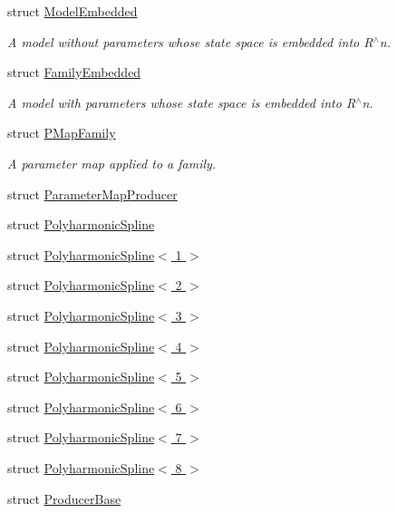 \begin{DoxyCompactItemize}
struct \hyperlink{struct_d_r_d_s_p_1_1_model_embedded}{Model\-Embedded}
\begin{DoxyCompactList}\small\item\em A model without parameters whose state space is embedded into R$^\wedge$n. \end{DoxyCompactList}\item 
struct \hyperlink{struct_d_r_d_s_p_1_1_family_embedded}{Family\-Embedded}
\begin{DoxyCompactList}\small\item\em A model with parameters whose state space is embedded into R$^\wedge$n. \end{DoxyCompactList}\item 
struct \hyperlink{struct_d_r_d_s_p_1_1_p_map_family}{P\-Map\-Family}
\begin{DoxyCompactList}\small\item\em A parameter map applied to a family. \end{DoxyCompactList}\item 
struct \hyperlink{struct_d_r_d_s_p_1_1_parameter_map_producer}{Parameter\-Map\-Producer}
\item 
struct \hyperlink{struct_d_r_d_s_p_1_1_polyharmonic_spline}{Polyharmonic\-Spline}
\item 
struct \hyperlink{struct_d_r_d_s_p_1_1_polyharmonic_spline_3_011_01_4}{Polyharmonic\-Spline$<$ 1 $>$}
\item 
struct \hyperlink{struct_d_r_d_s_p_1_1_polyharmonic_spline_3_012_01_4}{Polyharmonic\-Spline$<$ 2 $>$}
\item 
struct \hyperlink{struct_d_r_d_s_p_1_1_polyharmonic_spline_3_013_01_4}{Polyharmonic\-Spline$<$ 3 $>$}
\item 
struct \hyperlink{struct_d_r_d_s_p_1_1_polyharmonic_spline_3_014_01_4}{Polyharmonic\-Spline$<$ 4 $>$}
\item 
struct \hyperlink{struct_d_r_d_s_p_1_1_polyharmonic_spline_3_015_01_4}{Polyharmonic\-Spline$<$ 5 $>$}
\item 
struct \hyperlink{struct_d_r_d_s_p_1_1_polyharmonic_spline_3_016_01_4}{Polyharmonic\-Spline$<$ 6 $>$}
\item 
struct \hyperlink{struct_d_r_d_s_p_1_1_polyharmonic_spline_3_017_01_4}{Polyharmonic\-Spline$<$ 7 $>$}
\item 
struct \hyperlink{struct_d_r_d_s_p_1_1_polyharmonic_spline_3_018_01_4}{Polyharmonic\-Spline$<$ 8 $>$}
\item 
struct \hyperlink{struct_d_r_d_s_p_1_1_producer_base}{Producer\-Base}

\end{DoxyCompactItemize}
